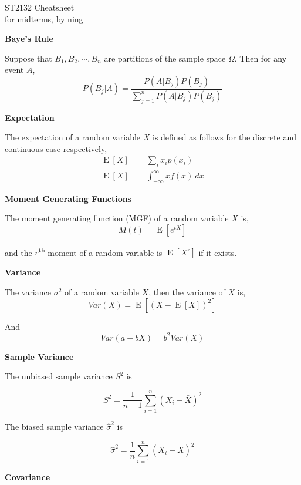 \documentclass[a4paper]{article}
\newcommand{\subheading}[1]{{\scriptsize\textbf{#1}}}
\newcommand{\expectation}[1]{\operatorname{E}[#1]}
\begin{document}
\scriptsize                         %
\setlength\parindent{0pt}           %
\setlength{\abovedisplayskip}{3pt}  %
\setlength{\belowdisplayskip}{3pt}  %

\begin{center}
  {\large ST2132 Cheatsheet}\\{for midterms, by ning}
\end{center}

\begin{multicols*}{4}

\subheading{Baye's Rule}

Suppose that $B_1, B_2, \cdots, B_n$ are partitions of the sample space $\Omega$.
Then for any event $A$,
$$P(B_j|A) = \frac{P(A|B_j) P(B_j)}{\sum^n_{j=1} P(A|B_j)P(B_j)}$$

\subheading{Expectation}

The expectation of a random variable $X$ is defined as follows for the discrete
and continuous case respectively,
\begin{align*}
  \expectation{X} &= \sum_i x_i p(x_i) \\
  \expectation{X} &= \int^\infty_{-\infty} xf(x)\ dx
\end{align*}

\subheading{Moment Generating Functions}

The moment generating function (MGF) of a random variable $X$ is,
$$M(t) = \expectation{e^{tX}}$$

and the $r$\textsuperscript{th} moment of a random variable is
$\expectation{X^r}$ if it exists. \smallskip

\subheading{Variance}

The variance $\sigma^2$ of a random variable $X$, then the variance of $X$ is,
$$Var(X) = \expectation{ (X- \expectation{X})^2 }$$

And
$$Var(a + bX) = b^2Var(X)$$

\subheading{Sample Variance}

The unbiased sample variance $S^2$ is

$$S^2 = \frac{1}{n-1} \sum^n_{i=1} (X_i - \bar{X})^2$$

The biased sample variance $\hat{\sigma}^2$ is

$$\hat{\sigma}^2 = \frac{1}{n}\sum^n_{i=1} (X_i - \bar{X})^2$$

\subheading{Covariance}


\end{multicols*}
\end{document}

